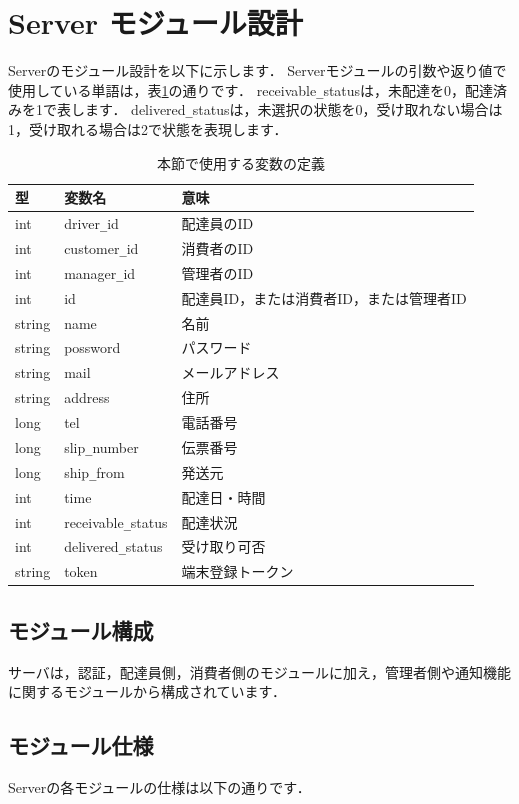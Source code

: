 \documentclass[a4j,titlepage]{jarticle}
\begin{document}
\section{Server モジュール設計}
Serverのモジュール設計を以下に示します．
Serverモジュールの引数や返り値で使用している単語は，表\ref{serverTable}の通りです．
receivable\verb|_|statusは，未配達を0，配達済みを1で表します．
delivered\verb|_|statusは，未選択の状態を0，受け取れない場合は1，受け取れる場合は2で状態を表現します．
\begin{table}[htb]
\centering
\caption{本節で使用する変数の定義}
\label{serverTable}
\begin{tabular}{|lll|}
\hline
型 & 変数名 & 意味      \\ \hline
int & driver\verb|_|id & 配達員のID     \\
int & customer\verb|_|id & 消費者のID     \\
int & manager\verb|_|id & 管理者のID     \\
int & id & 配達員ID，または消費者ID，または管理者ID \\
string  & name  & 名前     \\
string & possword & パスワード     \\
string & mail & メールアドレス     \\
string & address & 住所     \\
long & tel & 電話番号     \\
long  &  slip\verb|_|number  & 伝票番号   \\
long & ship\verb|_|from & 発送元     \\
int & time & 配達日・時間     \\
int & receivable\verb|_|status & 配達状況    \\
int & delivered\verb|_|status  &  受け取り可否  \\
string & token & 端末登録トークン \\ \hline
\end{tabular}
\end{table}
\clearpage

\subsection{モジュール構成}
サーバは，認証，配達員側，消費者側のモジュールに加え，管理者側や通知機能に関するモジュールから構成されています．

\subsection{モジュール仕様}
Serverの各モジュールの仕様は以下の通りです．
\end{document}
